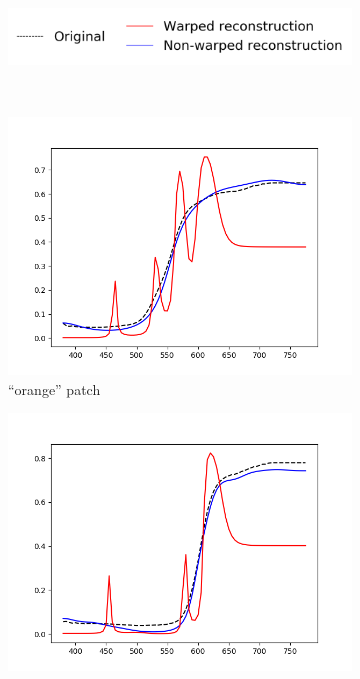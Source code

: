 \begin{figure}[t]
	\centering
	\captionsetup[subfigure]{font=footnotesize,labelfont=footnotesize}
	\captionsetup[subfigure]{justification=centering}
	\begin{subfigure}[t]{0.50\textwidth}
		\includegraphics[width=\linewidth]{img/results_techniqueLegend.png}
	\end{subfigure} \\
	\begin{subfigure}[t]{0.32\textwidth}
		\includegraphics[width=\linewidth]{img/results_warping_orange.png}
		\caption{``orange'' patch}
		\label{fig:warping_alp_neutral50}
	\end{subfigure} \hspace{0.1em}
	\begin{subfigure}[t]{0.32\textwidth}
		\includegraphics[width=\linewidth]{img/results_warping_red.png}

\end{subfigure}
\end{figure}

